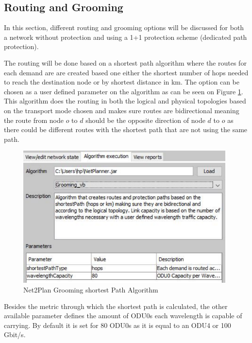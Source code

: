 	\subsection{Routing and Grooming} \label{Routing and Grooming}
	
	\vspace{1cm}
	In this section, different routing and grooming options will be discussed for both a network without protection and using a 1+1 protection scheme (dedicated path protection).
		
	The routing will be done based on a shortest path algorithm where the routes for each demand are are created based one either the shortest number of hops needed to reach the destination node or by shortest distance in km. The option can be chosen as a user defined parameter on the algorithm as can be seen on Figure \ref{Grooming_Algorithm}. This algorithm does the routing in both the logical and physical topologies based on the transport mode chosen and makes sure routes are bidirectional meaning the route from node $o$ to $d$ should be the opposite direction of node $d$ to $o$ as there could be different routes with the shortest path that are not using the same path.
	
	\vspace{0.5cm}
	\begin{figure}[h!]
		\centering
		\includegraphics[width = 11cm]{Grooming_Algorithm.pdf}
		\caption{Net2Plan Grooming shortest Path Algorithm}
		\label{Grooming_Algorithm}
	\end{figure}	
	
	Besides the metric through which the shortest path is calculated, the other available parameter defines the amount of ODU0s each wavelength is capable of carrying. By default it is set for 80 ODU0s as it is equal to an ODU4 or 100 Gbit/s.\\

